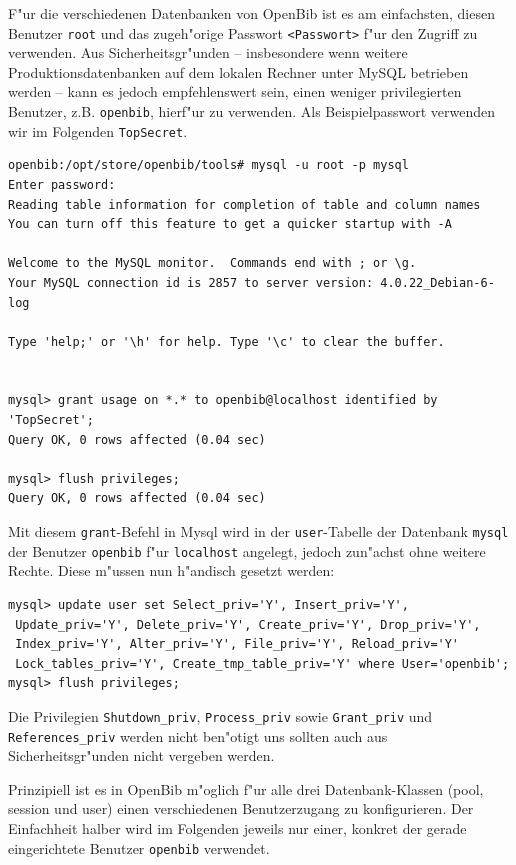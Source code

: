 \documentclass[11pt, twoside, a4paper, BCOR8mm, DIV12, bibtotoc,idxtotoc]{scrbook}
\begin{document}
F"ur die verschiedenen Datenbanken von OpenBib ist es am einfachsten,
diesen Benutzer \texttt{root} und das zugeh"orige Passwort
\texttt{<Passwort>} f"ur den Zugriff zu verwenden. Aus
Sicherheitsgr"unden -- insbesondere wenn weitere
Produktionsdatenbanken auf dem lokalen Rechner unter MySQL betrieben
werden -- kann es jedoch empfehlenswert sein, einen weniger
privilegierten Benutzer, z.B. \texttt{openbib}, hierf"ur zu verwenden.
Als Beispielpasswort verwenden wir im Folgenden \texttt{TopSecret}.


\begin{verbatim}
openbib:/opt/store/openbib/tools# mysql -u root -p mysql
Enter password:
Reading table information for completion of table and column names
You can turn off this feature to get a quicker startup with -A

Welcome to the MySQL monitor.  Commands end with ; or \g.
Your MySQL connection id is 2857 to server version: 4.0.22_Debian-6-log

Type 'help;' or '\h' for help. Type '\c' to clear the buffer.


mysql> grant usage on *.* to openbib@localhost identified by 'TopSecret';
Query OK, 0 rows affected (0.04 sec)

mysql> flush privileges;
Query OK, 0 rows affected (0.04 sec)
\end{verbatim}

Mit diesem \texttt{grant}-Befehl in Mysql wird in der
\texttt{user}-Tabelle der Datenbank \texttt{mysql} der Benutzer
\texttt{openbib} f"ur \texttt{localhost} angelegt, jedoch zun"achst
ohne weitere Rechte. Diese m"ussen nun h"andisch gesetzt werden:

\begin{verbatim}
mysql> update user set Select_priv='Y', Insert_priv='Y',
 Update_priv='Y', Delete_priv='Y', Create_priv='Y', Drop_priv='Y', 
 Index_priv='Y', Alter_priv='Y', File_priv='Y', Reload_priv='Y' 
 Lock_tables_priv='Y', Create_tmp_table_priv='Y' where User='openbib';
mysql> flush privileges;
\end{verbatim}

Die Privilegien \texttt{Shutdown\_priv},
\texttt{Process\_priv} sowie \texttt{Grant\_priv}
und \texttt{References\_priv} werden nicht ben"otigt uns sollten auch
aus Sicherheitsgr"unden nicht vergeben werden.

Prinzipiell ist es in OpenBib m"oglich f"ur alle drei
Datenbank-Klassen (pool, session und user) einen verschiedenen
Benutzerzugang zu konfigurieren. Der Einfachheit halber wird im
Folgenden jeweils nur einer, konkret der gerade eingerichtete Benutzer
\texttt{openbib} verwendet.
\end{document}
